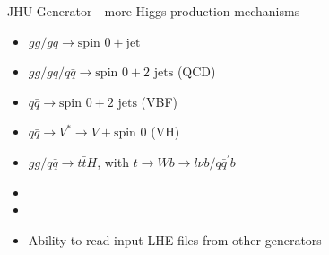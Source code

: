 \documentclass[usenames,dvipsnames,svgnames,table]{beamer}
\newcommand{\spin}[1]{\text{spin }#1}
\begin{document}
\begin{frame}{JHU Generator---more Higgs production mechanisms}
\begin{itemize}
\item $gg/gq\to\spin{0}+\text{jet}$
\item $gg/gq/q\bar{q}\to\spin{0}+2\text{ jets}$ (QCD)
\item $q\bar{q}\to\spin{0}+2\text{ jets}$ (VBF)
\item $q\bar{q}\to V^*\to V+\spin{0}$ (VH)
\item $gg/q\bar{q}\to t\bar{t}H$, with $t\to Wb \to l\nu b/q\bar{q}^\prime b$
\item
\item
\item Ability to read input LHE files from other generators
\end{itemize}
\end{frame}
\end{document}

